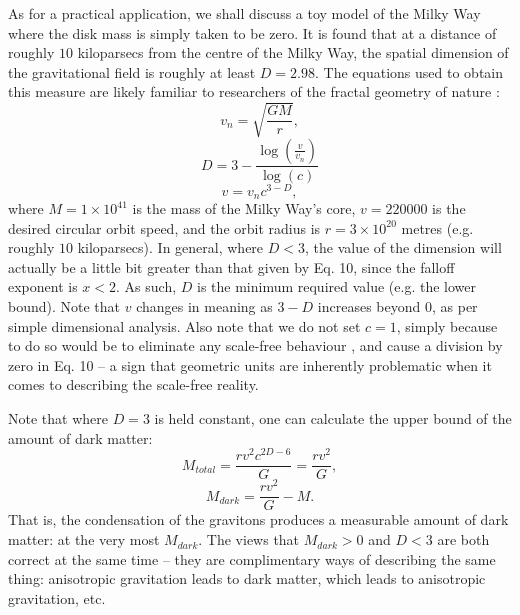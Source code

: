 \documentclass[12pt]{article}
\begin{document}
As for a practical application, we shall discuss a toy model of the Milky Way where the disk mass is simply taken to be zero.
It is found that at a distance of roughly $10$ kiloparsecs from the centre of the Milky Way, the spatial dimension of the gravitational field is roughly at least $D = 2.98$.
The equations used to obtain this measure are likely familiar to researchers of the fractal geometry of nature \cite{mandelbrot}:
\begin{equation}
v_n = \sqrt{\frac{GM}{r}},
\end{equation}
\begin{equation}
D = 3 - \frac{\log \left(\frac{v}{v_n} \right)}{\log(c)}
\end{equation}
\begin{equation}
v = v_n c^{3 - D},
\end{equation}
where $M = 1 \times 10^{41}$ is the mass of the Milky Way's core, $v = 220000$ is the desired circular orbit speed, and the orbit radius is $r = 3 \times 10^{20}$ metres (e.g. roughly $10$ kiloparsecs).
In general, where $D < 3$, the value of the dimension will actually be a little bit greater than that given by Eq. 10, since the falloff exponent is $x < 2$.
As such, $D$ is the minimum required value (e.g. the lower bound).
Note that $v$ changes in meaning as ${3 - D}$ increases beyond $0$, as per simple dimensional analysis.
Also note that we do not set $c = 1$, simply because to do so would be to eliminate any scale-free behaviour \cite{mm}, and cause a division by zero in Eq. 10 -- a sign that geometric units are inherently problematic when it comes to describing the scale-free reality.




Note that where $D = 3$ is held constant, one can calculate the upper bound of the amount of dark matter:
\begin{equation}
M_{total} = \frac{r v^2 c^{2D - 6}}{G} = \frac{r v^2}{G},
\end{equation}
\begin{equation}
M_{dark} = \frac{r v^2}{G} - M.
\end{equation}
That is, the condensation of the gravitons produces a measurable amount of dark matter: at the very most $M_{dark}$.
The views that $M_{dark} > 0$ and $D < 3$ are both correct at the same time -- they are complimentary ways of describing the same thing: anisotropic gravitation leads to dark matter, which leads to anisotropic gravitation, etc.
\end{document}
